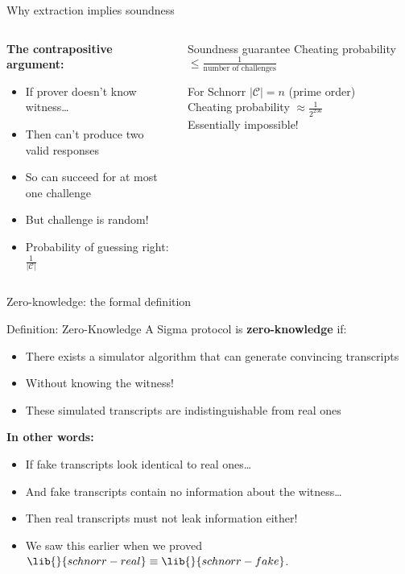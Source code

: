 \documentclass[aspectratio=169, lualatex, handout]{beamer}
\begin{document}
\begin{frame}{Why extraction implies soundness}
	\begin{columns}[c]
		\begin{column}{0.5\textwidth}
			\textbf{The contrapositive argument:}
			\begin{itemize}
				\item If prover doesn't know witness\ldots
				\item Then can't produce two valid responses
				\item So can succeed for at most one challenge
				\item But challenge is random!
				\item Probability of guessing right: $\frac{1}{|\mathcal{C}|}$
			\end{itemize}
		\end{column}
		\begin{column}{0.5\textwidth}
			\begin{alertblock}{Soundness guarantee}
				Cheating probability $\leq \frac{1}{\text{number of challenges}}$
			\end{alertblock}
			\vspace{0.5em}
			\begin{exampleblock}{For Schnorr}
				$|\mathcal{C}| = n$ (prime order)\\
				Cheating probability $\approx \frac{1}{2^{256}}$\\
				Essentially impossible!
			\end{exampleblock}
		\end{column}
	\end{columns}
\end{frame}

\begin{frame}{Zero-knowledge: the formal definition}
	\begin{block}{Definition: Zero-Knowledge}
		A Sigma protocol is \textbf{zero-knowledge} if:
		\begin{itemize}
			\item There exists a simulator algorithm that can generate convincing transcripts
			\item Without knowing the witness!
			\item These simulated transcripts are indistinguishable from real ones
		\end{itemize}
	\end{block}
	\vspace{0.5em}
	\textbf{In other words:}
	\begin{itemize}
		\item If fake transcripts look identical to real ones\ldots
		\item And fake transcripts contain no information about the witness\ldots
		\item Then real transcripts must not leak information either!
		\item We saw this earlier when we proved $\lib{}{schnorr-real} \equiv \lib{}{schnorr-fake}$.
	\end{itemize}
\end{frame}
\end{document}
